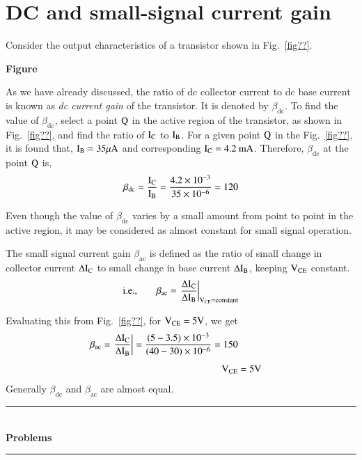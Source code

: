 \section{DC and small-signal current gain}\label{sec2.6}

Consider the output characteristics of a transistor shown in Fig.~\ref{fig??}.
\begin{center}
{\bf Figure}
\end{center}

As we have already discussed, the ratio of dc collector current to dc base current is known as {\em dc current gain} of the transistor. It is denoted by $\beta_{\text{dc}}$. To find the value of $\beta_{\text{dc}}$, select a point $\textrm{Q}$ in the active region of the transistor, as shown in Fig.~\ref{fig??}, and find the ratio of $\textrm{I}_{\textrm{C}}$ to $\textrm{I}_{\textrm{B}}$. For a given point $\textrm{Q}$ in the Fig.~\ref{fig??}, it is found that, $\textrm{I}_{\textrm{B}}=35\mu\textrm{A}$ and corresponding $\textrm{I}_{\textrm{C}}=4.2\text{~mA}$. Therefore, $\beta_{\text{dc}}$ at the point $\textrm{Q}$ is,
$$
\beta_{\text{dc}}=\dfrac{\textrm{I}_{\textrm{C}}}{\textrm{I}_{\textrm{B}}}=\dfrac{4.2\times 10^{-3}}{35\times 10^{-6}}=120
$$

Even though the value of $\beta_{\text{dc}}$ varies by a small amount from point to point in the active region, it may be considered as almost constant for small signal operation.

The small signal current gain $\beta_{\text{ac}}$ is defined as the ratio of small change in collector current $\Delta \textrm{I}_{\textrm{C}}$ to small change in base current $\Delta\textrm{I}_{\textrm{B}}$, keeping $\textrm{V}_{\text{CE}}$ constant.
\begin{equation}
\text{i.e.,}\qquad \beta_{\text{ac}}=\left.\dfrac{\Delta \textrm{I}_{\textrm{C}}}{\Delta \textrm{I}_{\textrm{B}}}\right|_{\textrm{V}_{\text{CE}}=\text{constant}}\label{eq2.26}
\end{equation}

Evaluating this from Fig.~\ref{fig??}, for $\textrm{V}_{\text{CE}}=5\textrm{V}$, we get
\begin{align*}
\beta_{\text{ac}}=\left.\dfrac{\Delta \textrm{I}_{\textrm{C}}}{\Delta \textrm{I}_{\textrm{B}}}\right|=\dfrac{(5-3.5)\times 10^{-3}}{(40-30)\times 10^{-6}}=150\\[4pt]
\textrm{V}_{\text{CE}} &= 5\textrm{V}
\end{align*}
Generally $\beta_{\text{dc}}$ and $\beta_{\text{ac}}$ are almost equal.

\begin{center}
\rule{4cm}{1pt}\\
{\bf\Large Problems}\\[-3pt]
\rule{4cm}{1pt}
\end{center}

